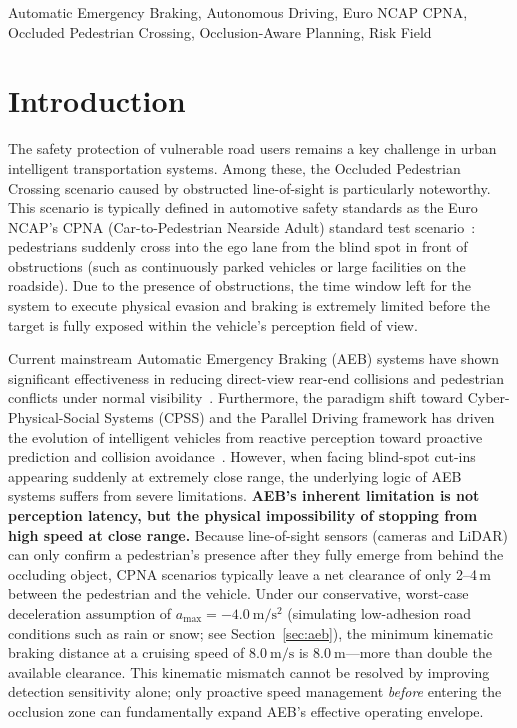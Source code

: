 \documentclass[conference]{IEEEtran}
\begin{document}
\begin{IEEEkeywords}
Automatic Emergency Braking, Autonomous Driving, Euro NCAP CPNA, Occluded Pedestrian Crossing, Occlusion-Aware Planning, Risk Field
\end{IEEEkeywords}

\section{Introduction}

The safety protection of vulnerable road users remains a key challenge in urban intelligent transportation systems. Among these, the Occluded Pedestrian Crossing scenario caused by obstructed line-of-sight is particularly noteworthy. This scenario is typically defined in automotive safety standards as the Euro NCAP's CPNA (Car-to-Pedestrian Nearside Adult) standard test scenario~\cite{euroncap2023}: pedestrians suddenly cross into the ego lane from the blind spot in front of obstructions (such as continuously parked vehicles or large facilities on the roadside). Due to the presence of obstructions, the time window left for the system to execute physical evasion and braking is extremely limited before the target is fully exposed within the vehicle's perception field of view.

Current mainstream Automatic Emergency Braking (AEB) systems have shown significant effectiveness in reducing direct-view rear-end collisions and pedestrian conflicts under normal visibility~\cite{cicchino2022effects}. Furthermore, the paradigm shift toward Cyber-Physical-Social Systems (CPSS) and the Parallel Driving framework has driven the evolution of intelligent vehicles from reactive perception toward proactive prediction and collision avoidance~\cite{wang2024parallel, wang2021review}. However, when facing blind-spot cut-ins appearing suddenly at extremely close range, the underlying logic of AEB systems suffers from severe limitations. \textbf{AEB's inherent limitation is not perception latency, but the physical impossibility of stopping from high speed at close range.} Because line-of-sight sensors (cameras and LiDAR) can only confirm a pedestrian's presence after they fully emerge from behind the occluding object, CPNA scenarios typically leave a net clearance of only 2--4\,\si{\meter} between the pedestrian and the vehicle. Under our conservative, worst-case deceleration assumption of $a_{\text{max}} = \SI{-4.0}{\meter\per\second\squared}$ (simulating low-adhesion road conditions such as rain or snow; see Section~\ref{sec:aeb}), the minimum kinematic braking distance at a cruising speed of $\SI{8.0}{\meter\per\second}$ is $\SI{8.0}{\meter}$---more than double the available clearance. This kinematic mismatch cannot be resolved by improving detection sensitivity alone; only proactive speed management \emph{before} entering the occlusion zone can fundamentally expand AEB's effective operating envelope.
\end{document}
